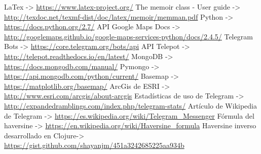 \documentclass[oneside]{memoir}
\begin{document}
\newpage
\begin{thebibliography}{14}
LaTex -> \url{https://www.latex-project.org/}
The memoir class - User guide -> \url{http://texdoc.net/texmf-dist/doc/latex/memoir/memman.pdf} 
Python -> \url{https://docs.python.org/2.7/}
API Google Maps Docs -> \url{http://googlemaps.github.io/google-maps-services-python/docs/2.4.5/}
Telegram Bots -> \url{https://core.telegram.org/bots/api}
API Telepot -> \url{http://telepot.readthedocs.io/en/latest/}
MongoDB -> \url{https://docs.mongodb.com/manual/}
Pymongo -> \url{https://api.mongodb.com/python/current/}
Basemap -> \url{https://matplotlib.org/basemap/}
ArcGis de ESRI -> \url{http://www.esri.com/arcgis/about-arcgis}
Estadísticas de uso de Telegram -> \url{http://expandedramblings.com/index.php/telegram-stats/}
Artículo de Wikipedia de Telegram -> \url{https://es.wikipedia.org/wiki/Telegram_Messenger}
Fórmula del haversine -> \url{https://en.wikipedia.org/wiki/Haversine_formula}
Haversine inverso desarrollado en Clojure-> \url{https://gist.github.com/shayanjm/451a3242685225aa934b}

\end{thebibliography}
\end{document}
